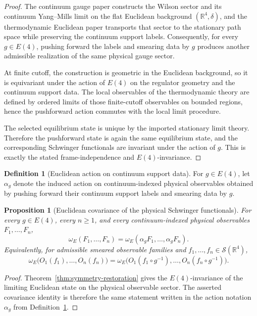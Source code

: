 \documentclass[11pt]{article}
\newtheorem{proposition}[theorem]{Proposition}
\theoremstyle{definition}
\newtheorem{definition}[theorem]{Definition}
\theoremstyle{remark}
\newcommand{\R}{\mathbb R}
\begin{document}
\begin{proof}
The continuum gauge paper constructs the Wilson sector and its continuum
Yang--Mills limit on the flat Euclidean background \((\R^4,\delta)\), and the
thermodynamic Euclidean paper transports that sector to the stationary path
space while preserving the continuum support labels.  Consequently, for every
\(g\in E(4)\), pushing forward the labels and smearing data by \(g\) produces
another admissible realization of the same physical gauge sector.

At finite cutoff, the construction is geometric in the Euclidean background, so
it is equivariant under the action of \(E(4)\) on the regulator geometry and
the continuum support data.  The local observables of the thermodynamic theory
are defined by ordered limits of those finite-cutoff observables on bounded
regions, hence the pushforward action commutes with the local limit procedure.

The selected equilibrium state is unique by the imported stationary limit
theory.  Therefore the pushforward state is again the same equilibrium state,
and the corresponding Schwinger functionals are invariant under the action of
\(g\).  This is exactly the stated frame-independence and \(E(4)\)-invariance.
\end{proof}

\begin{definition}[Euclidean action on continuum support data]
\label{def:e4-action}
For \(g\in E(4)\), let \(\alpha_g\) denote the induced action on
continuum-indexed physical observables obtained by pushing forward their
continuum support labels and smearing data by \(g\).
\end{definition}

\begin{proposition}[Euclidean covariance of the physical Schwinger functionals]
\label{prop:e4-covariance}
For every \(g\in E(4)\), every \(n\ge1\), and every continuum-indexed physical
observables \(F_1,\dots,F_n\),
\[
\omega_E(F_1,\dots,F_n)
=
\omega_E(\alpha_gF_1,\dots,\alpha_gF_n).
\]
Equivalently, for admissible smeared observable families and
\(f_1,\dots,f_n\in\mathcal S(\R^4)\),
\[
\omega_E\bigl(O_1(f_1),\dots,O_n(f_n)\bigr)
=
\omega_E\bigl(O_1(f_1\circ g^{-1}),\dots,O_n(f_n\circ g^{-1})\bigr).
\]
\end{proposition}

\begin{proof}
Theorem~\ref{thm:symmetry-restoration} gives the \(E(4)\)-invariance of the
limiting Euclidean state on the physical observable sector.  The asserted
covariance identity is therefore the same statement written in the action
notation \(\alpha_g\) from Definition~\ref{def:e4-action}.
\end{proof}
\end{document}
